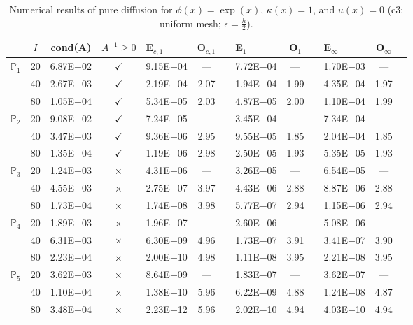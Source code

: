\begin{table}[H]
\centering
\caption{Numerical results of pure diffusion for $\phi(x)=\exp(x)$, $\kappa(x)=1$, and $u(x)=0$ (c3; uniform mesh; $\epsilon=\frac{h}{2}$).}
\begin{tabular}{@{}l c c c l c c l c c l c c@{}}
\toprule
 & $I$ & cond(A) & $A^{-1}\geq 0$ &  E$_{c,1}$ & O$_{c,1}$ && E$_1$ & O$_1$ && E$_{\infty}$ & O$_{\infty}$\\
\midrule
\multirow{3}{*}{$\mathbb{P}_{1}$}
 & 20 & 6.87E$+$02 & $\checkmark$ & 9.15E$-$04 & --- && 7.72E$-$04 & --- && 1.70E$-$03 & ---\\
 & 40 & 2.67E$+$03 & $\checkmark$ & 2.19E$-$04 & 2.07 && 1.94E$-$04 & 1.99 && 4.35E$-$04 & 1.97\\
 & 80 & 1.05E$+$04 & $\checkmark$ & 5.34E$-$05 & 2.03 && 4.87E$-$05 & 2.00 && 1.10E$-$04 & 1.99\\
\midrule
\multirow{3}{*}{$\mathbb{P}_{2}$}
 & 20 & 9.08E$+$02 & $\checkmark$ & 7.24E$-$05 & --- && 3.45E$-$04 & --- && 7.34E$-$04 & ---\\
 & 40 & 3.47E$+$03 & $\checkmark$ & 9.36E$-$06 & 2.95 && 9.55E$-$05 & 1.85 && 2.04E$-$04 & 1.85\\
 & 80 & 1.35E$+$04 & $\checkmark$ & 1.19E$-$06 & 2.98 && 2.50E$-$05 & 1.93 && 5.35E$-$05 & 1.93\\
\midrule
\multirow{3}{*}{$\mathbb{P}_{3}$}
 & 20 & 1.24E$+$03 & $\times$ & 4.31E$-$06 & --- && 3.26E$-$05 & --- && 6.54E$-$05 & ---\\
 & 40 & 4.55E$+$03 & $\times$ & 2.75E$-$07 & 3.97 && 4.43E$-$06 & 2.88 && 8.87E$-$06 & 2.88\\
 & 80 & 1.73E$+$04 & $\times$ & 1.74E$-$08 & 3.98 && 5.77E$-$07 & 2.94 && 1.15E$-$06 & 2.94\\
\midrule
\multirow{3}{*}{$\mathbb{P}_{4}$}
 & 20 & 1.89E$+$03 & $\times$ & 1.96E$-$07 & --- && 2.60E$-$06 & --- && 5.08E$-$06 & ---\\
 & 40 & 6.31E$+$03 & $\times$ & 6.30E$-$09 & 4.96 && 1.73E$-$07 & 3.91 && 3.41E$-$07 & 3.90\\
 & 80 & 2.23E$+$04 & $\times$ & 2.00E$-$10 & 4.98 && 1.11E$-$08 & 3.95 && 2.21E$-$08 & 3.95\\
\midrule
\multirow{3}{*}{$\mathbb{P}_{5}$}
 & 20 & 3.62E$+$03 & $\times$ & 8.64E$-$09 & --- && 1.83E$-$07 & --- && 3.62E$-$07 & ---\\
 & 40 & 1.10E$+$04 & $\times$ & 1.38E$-$10 & 5.96 && 6.22E$-$09 & 4.88 && 1.24E$-$08 & 4.87\\
 & 80 & 3.48E$+$04 & $\times$ & 2.23E$-$12 & 5.96 && 2.02E$-$10 & 4.94 && 4.03E$-$10 & 4.94\\
\bottomrule
\end{tabular}
\end{table}